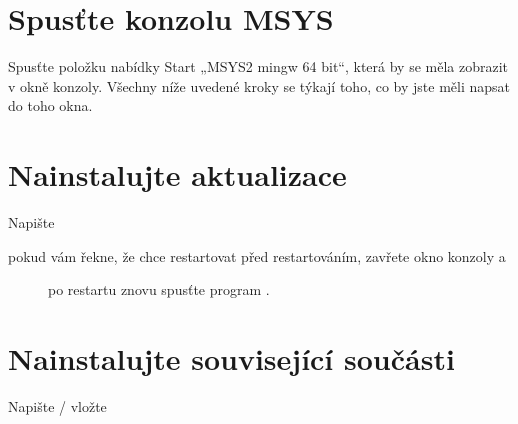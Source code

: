 \documentclass[letterpaper,10pt,czech]{sphinxmanual}
\begin{document}
\section{Spusťte konzolu MSYS}
\label{\detokenize{build-win32:spustte-konzolu-msys}}
Spusťte položku nabídky Start „MSYS2 mingw 64 bit“, která by se měla zobrazit
v okně konzoly. Všechny níže uvedené kroky se týkají toho, co by jste měli napsat
do toho okna.


\section{Nainstalujte aktualizace}
\label{\detokenize{build-win32:nainstalujte-aktualizace}}
Napište

\begin{sphinxVerbatim}[commandchars=\\\{\}]
 
\end{sphinxVerbatim}
\begin{description}
\item[{pokud vám řekne, že chce restartovat před restartováním, zavřete okno konzoly a}] \leavevmode
po restartu znovu spusťte program .

\end{description}


\section{Nainstalujte související součásti}
\label{\detokenize{build-win32:nainstalujte-souvisejici-soucasti}}
Napište / vložte
\end{document}
